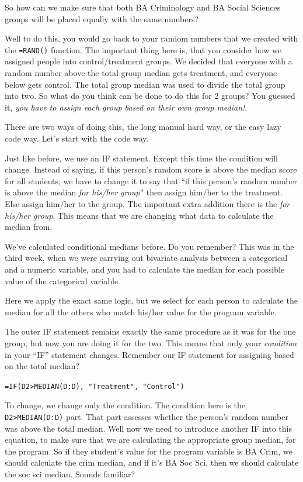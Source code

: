 \documentclass[]{book}
\theoremstyle{definition}
\theoremstyle{definition}
\theoremstyle{definition}
\theoremstyle{remark}
\begin{document}
So how can we make sure that both BA Criminology and BA Social Sciences
groups will be placed equally with the same numbers?

Well to do this, you would go back to your random numbers that we
created with the \texttt{=RAND()} function. The important thing here is,
that you consider how we assigned people into control/treatment groups.
We decided that everyone with a random number above the total group
median gets treatment, and everyone below gets control. The total group
median was used to divide the total group into two. So what do you think
can be done to do this for 2 groups? You guessed it, \emph{you have to
assign each group based on their own group median!}.

There are two ways of doing this, the long manual hard way, or the easy
lazy code way. Let's start with the code way.

Just like before, we use an IF statement. Except this time the condition
will change. Instead of saying, if this person's random score is above
the median score for all students, we have to change it to say that ``if
this person's random number is above the median \emph{for his/her
group}'' then assign him/her to the treatment. Else assign him/her to
the group. The important extra addition there is the \emph{for his/her
group}. This means that we are changing what data to calculate the
median from.

We've calculated conditional medians before. Do you remember? This was
in the third week, when we were carrying out bivariate analysis between
a categorical and a numeric variable, and you had to calculate the
median for each possible value of the categorical variable.

Here we apply the exact same logic, but we select for each person to
calculate the median for all the others who match his/her value for the
program variable.

The outer IF statement remains exactly the same procedure as it was for
the one group, but now you are doing it for the two. This means that
only your \emph{condition} in your ``IF'' statement changes. Remember
our IF statement for assigning based on the total median?

\texttt{=IF(D2\textgreater{}MEDIAN(D:D),\ "Treatment",\ "Control")}

To change, we change only the condition. The condition here is the
\texttt{D2\textgreater{}MEDIAN(D:D)} part. That part assesses whether
the person's random number was above the total median. Well now we need
to introduce another IF into this equation, to make sure that we are
calculating the appropriate group median, for the program. So if they
student's value for the program variable is BA Crim, we should calculate
the crim median, and if it's BA Soc Sci, then we should calculate the
soc sci median. Sounds familiar?
\end{document}
